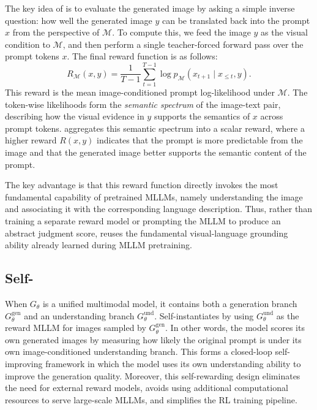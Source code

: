 The key idea of \method is to evaluate the generated image by asking a simple inverse question: 
how well the generated image $y$ can be translated back into the prompt $x$ from the perspective of $\mathcal{M}$.
To compute this, we feed the image $y$ as the visual condition
to $\mathcal{M}$, and then perform a single teacher-forced forward pass over the prompt tokens $x$.
The final reward function is as follows:
\begin{equation}
  \label{eq:method_reward}
  R_{\mathcal{M}}(x,y)
  =
  \frac{1}{T-1}
  \sum_{t=1}^{T-1}
  \log p_{\mathcal{M}}(x_{t+1} \mid x_{\le t}, y).
\end{equation}
This reward is the mean image-conditioned prompt log-likelihood under $\mathcal{M}$. 
The token-wise likelihoods form the \emph{semantic spectrum} of the image-text pair, 
describing how the visual evidence in $y$ supports the semantics of $x$ across prompt tokens.
\method aggregates this semantic spectrum into a scalar reward, where a higher reward $R(x,y)$ indicates that 
the prompt is more predictable from the image and that the generated image better supports the semantic content of the prompt.

The key advantage is that this reward function directly invokes the most fundamental capability of pretrained
MLLMs, namely understanding the image and associating it with the corresponding language description.
Thus, rather than training a separate reward model or prompting the MLLM to produce an abstract judgment score, 
\method reuses the fundamental visual-language grounding ability already learned during MLLM pretraining.

\subsection{Self-\method}
\label{sec:self_reward_def}
When $G_\theta$ is a unified multimodal model, it contains both a
generation branch $G_\theta^{\mathrm{gen}}$ and an understanding branch
$G_\theta^{\mathrm{und}}$. Self-\method instantiates \method by using
$G_\theta^{\mathrm{und}}$ as the reward MLLM for images sampled by $G_\theta^{\mathrm{gen}}$. 
In other words, the model scores its own generated images by measuring 
how likely the original prompt is under its own image-conditioned understanding branch.
This forms a closed-loop self-improving framework in which the model uses its own understanding ability to improve the generation quality.
Moreover, this self-rewarding design eliminates the need for external reward models,
avoids using additional computational resources to serve large-scale MLLMs, and simplifies the RL training pipeline.

